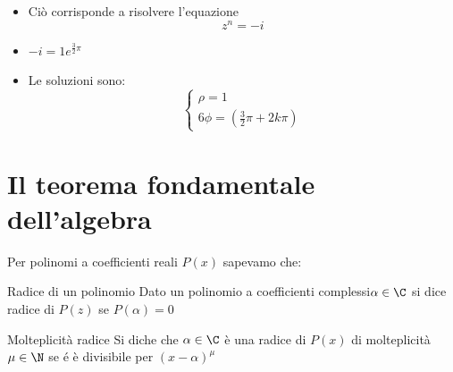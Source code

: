\begin{itemize}
	\item Ciò corrisponde a risolvere l'equazione \[
		      z^{n} = -i
	      \]
	\item $-i= 1e^{\frac{3}{2}\pi}$
	\item Le soluzioni sono:
	      \[
		      \begin{cases}
			      \rho = 1 \\
			      6 \phi =\left( \frac{3}{2} \pi  + 2k\pi \right)
		      \end{cases}
	      \]
\end{itemize}
%
\begin{center}
\end{center}
\section{Il teorema fondamentale dell'algebra}
Per polinomi a coefficienti reali $P\left( x \right) $ sapevamo che:

\begin{definizione}{Radice di un polinomio}
	Dato un polinomio a coefficienti complessi$\alpha  \in  \C$ si dice radice di  $P\left( z \right) $ se $P\left( \alpha \right) =0$
\end{definizione}

\begin{definizione}{Molteplicità radice}
	Si diche che $\alpha  \in  \C$ è una radice di $ P\left( x \right) $ di molteplicità $ \mu  \in  \N$ se é è divisibile per $\left( x-\alpha \right) ^{\mu}$
\end{definizione}

